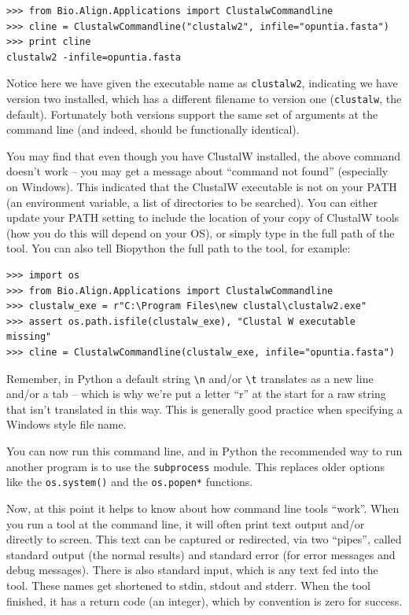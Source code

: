 \documentclass{report}
\begin{document}
\begin{verbatim}
>>> from Bio.Align.Applications import ClustalwCommandline
>>> cline = ClustalwCommandline("clustalw2", infile="opuntia.fasta")
>>> print cline
clustalw2 -infile=opuntia.fasta
\end{verbatim}

Notice here we have given the executable name as \texttt{clustalw2},
indicating we have version two installed, which has a different filename to
version one (\texttt{clustalw}, the default). Fortunately both versions
support the same set of arguments at the command line (and indeed, should be
functionally identical).

You may find that even though you have ClustalW installed, the above command
doesn't work -- you may get a message about ``command not found'' (especially
on Windows). This indicated that the ClustalW executable is not on your PATH
(an environment variable, a list of directories to be searched). You can
either update your PATH setting to include the location of your copy of
ClustalW tools (how you do this will depend on your OS), or simply type in
the full path of the tool. You can also tell Biopython the full
path to the tool, for example:

\begin{verbatim}
>>> import os
>>> from Bio.Align.Applications import ClustalwCommandline
>>> clustalw_exe = r"C:\Program Files\new clustal\clustalw2.exe"
>>> assert os.path.isfile(clustalw_exe), "Clustal W executable missing"
>>> cline = ClustalwCommandline(clustalw_exe, infile="opuntia.fasta")
\end{verbatim}

\noindent Remember, in Python a default string \verb|\n| and/or \verb|\t|
translates as a new line and/or a tab -- which is why we're put a letter
``r'' at the start for a raw string that isn't translated in this way.
This is generally good practice when specifying a Windows style file name.

You can now run this command line, and in Python the recommended way to
run another program is to use the \verb|subprocess| module. This replaces
older options like the \verb|os.system()| and the \verb|os.popen*| functions.

Now, at this point it helps to know about how command line tools ``work''.
When you run a tool at the command line, it will often print text output
and/or directly to screen. This text can be captured or redirected, via
two ``pipes'', called standard output (the normal results) and standard
error (for error messages and debug messages). There is also standard
input, which is any text fed into the tool. These names get shortened
to stdin, stdout and stderr. When the tool finished, it has a return
code (an integer), which by convention is zero for success.
\end{document}
